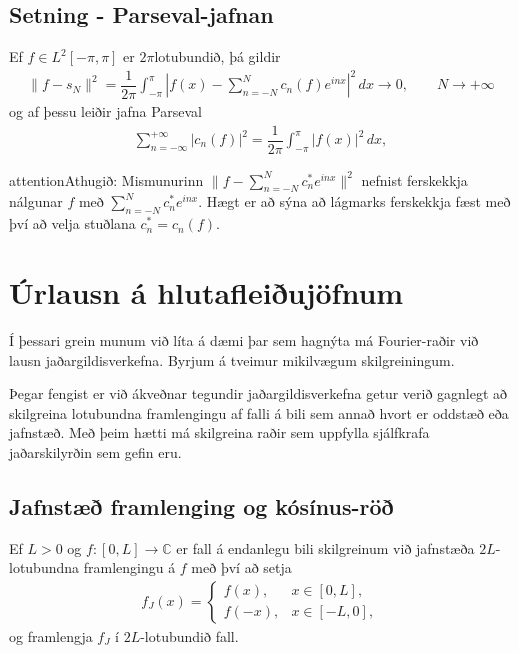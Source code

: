 \documentclass[a4paper,10pt,icelandic]{sphinxmanual}
\begin{document}
\subsection{Setning - Parseval-jafnan}
\label{\detokenize{Kafli02:setning-parseval-jafnan}}
Ef \(f\in L^2[-\pi,\pi]\) er \(2\pi\)\textendash{}lotubundið, þá gildir
\begin{equation*}
\begin{split}\|f-s_N\|^2=\dfrac 1{2\pi}\int_{-\pi}^{\pi} |f(x)-\sum_{n=-N}^{N}
 c_n(f) e^{in x}|^2\, dx \to 0, \qquad N\to +\infty\end{split}
\end{equation*}
og af þessu leiðir jafna Parseval
\begin{equation*}
\begin{split}\sum_{n=-\infty}^{+\infty} |c_n(f)|^2 = \dfrac 1{2\pi}\int_{-\pi}^{\pi}
 |f(x)|^2 \, dx,\end{split}
\end{equation*}
\begin{sphinxadmonition}{attention}{Athugið:}
Mismunurinn \(\|f-\sum_{n=-N}^{N}   c^\ast_n e^{in x}\|^2\) nefnist ferskekkja nálgunar \(f\) með \(\sum_{n=-N}^{N} c^\ast_n e^{in x}\). Hægt er að sýna að lágmarks ferskekkja fæst með því að velja stuðlana \(c^\ast_n = c_n(f)\).
\end{sphinxadmonition}


\section{Úrlausn á hlutafleiðujöfnum}
\label{\detokenize{Kafli02:urlausn-a-hlutafleiujofnum}}
Í þessari grein munum við líta á dæmi þar sem hagnýta má Fourier-raðir við lausn jaðargildisverkefna. Byrjum á tveimur mikilvægum skilgreiningum.

Þegar fengist er við ákveðnar tegundir jaðargildisverkefna getur verið gagnlegt að skilgreina lotubundna framlengingu af falli á bili sem annað hvort er oddstæð eða jafnstæð. Með þeim hætti má skilgreina raðir sem uppfylla sjálfkrafa jaðarskilyrðin sem gefin eru.


\subsection{Jafnstæð framlenging og kósínus-röð}
\label{\detokenize{Kafli02:jafnstae-framlenging-og-kosinus-ro}}
Ef \(L>0\) og \(f: [0,L]\to \mathbb{C}\) er fall á endanlegu bili skilgreinum við jafnstæða \(2L\)-lotubundna framlengingu á \(f\) með því að setja
\begin{equation*}
\begin{split}f_J(x)=\begin{cases} f(x), & x\in [0,L],\\  f(-x), & x\in
  [-L,0],\end{cases}\end{split}
\end{equation*}
og framlengja \(f_J\) í \(2L\)-lotubundið fall.
\end{document}
